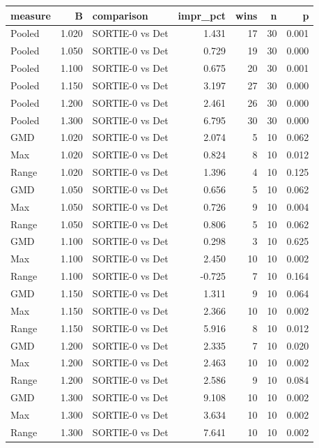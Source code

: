 \begin{tabular}{lrlrrrr}
\toprule
measure & B & comparison & impr\_pct & wins & n & p \\
\midrule
Pooled & 1.020 & SORTIE-0 vs Det & 1.431 & 17 & 30 & 0.001 \\
Pooled & 1.050 & SORTIE-0 vs Det & 0.729 & 19 & 30 & 0.000 \\
Pooled & 1.100 & SORTIE-0 vs Det & 0.675 & 20 & 30 & 0.001 \\
Pooled & 1.150 & SORTIE-0 vs Det & 3.197 & 27 & 30 & 0.000 \\
Pooled & 1.200 & SORTIE-0 vs Det & 2.461 & 26 & 30 & 0.000 \\
Pooled & 1.300 & SORTIE-0 vs Det & 6.795 & 30 & 30 & 0.000 \\
GMD & 1.020 & SORTIE-0 vs Det & 2.074 & 5 & 10 & 0.062 \\
Max & 1.020 & SORTIE-0 vs Det & 0.824 & 8 & 10 & 0.012 \\
Range & 1.020 & SORTIE-0 vs Det & 1.396 & 4 & 10 & 0.125 \\
GMD & 1.050 & SORTIE-0 vs Det & 0.656 & 5 & 10 & 0.062 \\
Max & 1.050 & SORTIE-0 vs Det & 0.726 & 9 & 10 & 0.004 \\
Range & 1.050 & SORTIE-0 vs Det & 0.806 & 5 & 10 & 0.062 \\
GMD & 1.100 & SORTIE-0 vs Det & 0.298 & 3 & 10 & 0.625 \\
Max & 1.100 & SORTIE-0 vs Det & 2.450 & 10 & 10 & 0.002 \\
Range & 1.100 & SORTIE-0 vs Det & -0.725 & 7 & 10 & 0.164 \\
GMD & 1.150 & SORTIE-0 vs Det & 1.311 & 9 & 10 & 0.064 \\
Max & 1.150 & SORTIE-0 vs Det & 2.366 & 10 & 10 & 0.002 \\
Range & 1.150 & SORTIE-0 vs Det & 5.916 & 8 & 10 & 0.012 \\
GMD & 1.200 & SORTIE-0 vs Det & 2.335 & 7 & 10 & 0.020 \\
Max & 1.200 & SORTIE-0 vs Det & 2.463 & 10 & 10 & 0.002 \\
Range & 1.200 & SORTIE-0 vs Det & 2.586 & 9 & 10 & 0.084 \\
GMD & 1.300 & SORTIE-0 vs Det & 9.108 & 10 & 10 & 0.002 \\
Max & 1.300 & SORTIE-0 vs Det & 3.634 & 10 & 10 & 0.002 \\
Range & 1.300 & SORTIE-0 vs Det & 7.641 & 10 & 10 & 0.002 \\
\bottomrule
\end{tabular}
